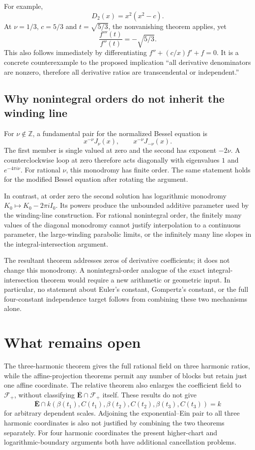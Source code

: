 \documentclass[11pt,a4paper]{article}
\theoremstyle{definition}\newtheorem{definition}[theorem]{Definition}
\theoremstyle{remark}\newtheorem{remark}[theorem]{Remark}
\begin{document}
For example,
\[
 D_2(x)=x^2(x^2-c).
\]
At $\nu=1/3$, $c=5/3$ and $t=\sqrt{5/3}$, the nonvanishing theorem
applies, yet
\[
 \frac{f'''(t)}{f''(t)}=-\sqrt{5/3}.
\]
This also follows immediately by differentiating
$f''+(c/x)f'+f=0$. It is a concrete counterexample to the proposed
implication ``all derivative denominators are nonzero, therefore all
derivative ratios are transcendental or independent.''

\subsection{Why nonintegral orders do not inherit the winding line}

For $\nu\notin\mathbb Z$, a fundamental pair for the normalized
Bessel equation is
\[
 x^{-\nu}J_\nu(x),\qquad x^{-\nu}J_{-\nu}(x).
\]
The first member is single valued at zero and the second has exponent
$-2\nu$. A counterclockwise loop at zero therefore acts diagonally
with eigenvalues $1$ and $e^{-4\pi i\nu}$. For rational $\nu$, this
monodromy has finite order. The same statement holds for the modified
Bessel equation after rotating the argument.

In contrast, at order zero the second solution has logarithmic
monodromy $K_0\mapsto K_0-2\pi i I_0$. Its powers produce the
unbounded additive parameter used by the winding-line construction.
For rational nonintegral order, the finitely many values of the
diagonal monodromy cannot justify interpolation to a continuous
parameter, the large-winding parabolic limits, or the infinitely many
line slopes in the integral-intersection argument.

The resultant theorem addresses zeros of derivative coefficients; it
does not change this monodromy. A nonintegral-order analogue of the
exact integral-intersection theorem would require a new arithmetic or
geometric input. In particular, no statement about Euler's constant,
Gompertz's constant, or the full four-constant independence target
follows from combining these two mechanisms alone.


\section{What remains open}
The three-harmonic theorem gives the full rational field on three
harmonic ratios, while the affine-projection theorems permit any number
of blocks but retain just one affine coordinate. The relative theorem
also enlarges the coefficient field to $\mathcal F_+$, without
classifying $\overline{\mathbf E}\cap\mathcal F_+$ itself. These results do not give
\[
 \overline{\mathbf E}\cap
 k(\beta(t_1),C(t_1),\beta(t_2),C(t_2),\beta(t_3),C(t_3))=k
\]
for arbitrary dependent scales. Adjoining the exponential--Ein pair to
all three harmonic coordinates is also not justified by combining the
two theorems separately. For four harmonic coordinates the present
higher-chart and logarithmic-boundary arguments both have additional
cancellation problems.
\end{document}
